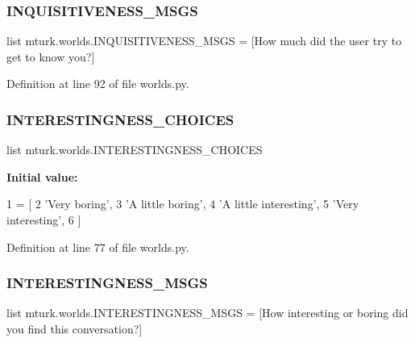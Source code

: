 \subsubsection{\texorpdfstring{I\+N\+Q\+U\+I\+S\+I\+T\+I\+V\+E\+N\+E\+S\+S\+\_\+\+M\+S\+GS}{INQUISITIVENESS\_MSGS}}
{\footnotesize\ttfamily list mturk.\+worlds.\+I\+N\+Q\+U\+I\+S\+I\+T\+I\+V\+E\+N\+E\+S\+S\+\_\+\+M\+S\+GS = \mbox{[}\textquotesingle{}How much did the user try to get to know you?\textquotesingle{}\mbox{]}}



Definition at line 92 of file worlds.\+py.

\mbox{\label{namespacemturk_1_1worlds_a87412657b3bb70c05828cec65d50434e}} 
\subsubsection{\texorpdfstring{I\+N\+T\+E\+R\+E\+S\+T\+I\+N\+G\+N\+E\+S\+S\+\_\+\+C\+H\+O\+I\+C\+ES}{INTERESTINGNESS\_CHOICES}}
{\footnotesize\ttfamily list mturk.\+worlds.\+I\+N\+T\+E\+R\+E\+S\+T\+I\+N\+G\+N\+E\+S\+S\+\_\+\+C\+H\+O\+I\+C\+ES}

{\bfseries Initial value\+:}
\begin{DoxyCode}
1 =  [
2     \textcolor{stringliteral}{'Very boring'},
3     \textcolor{stringliteral}{'A little boring'},
4     \textcolor{stringliteral}{'A little interesting'},
5     \textcolor{stringliteral}{'Very interesting'},
6 ]
\end{DoxyCode}


Definition at line 77 of file worlds.\+py.

\mbox{\label{namespacemturk_1_1worlds_ade34bd617d841f748fc0e97c0bd74139}} 
\subsubsection{\texorpdfstring{I\+N\+T\+E\+R\+E\+S\+T\+I\+N\+G\+N\+E\+S\+S\+\_\+\+M\+S\+GS}{INTERESTINGNESS\_MSGS}}
{\footnotesize\ttfamily list mturk.\+worlds.\+I\+N\+T\+E\+R\+E\+S\+T\+I\+N\+G\+N\+E\+S\+S\+\_\+\+M\+S\+GS = \mbox{[}\textquotesingle{}How interesting or boring did you find this conversation?\textquotesingle{}\mbox{]}}



